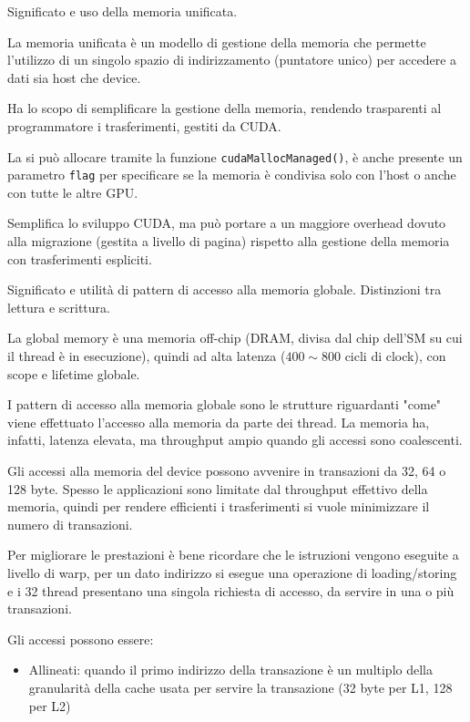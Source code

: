 \begin{questions}
    \question Significato e uso della memoria unificata.
    
    \begin{solution}
        La memoria unificata è un modello di gestione della memoria che permette l'utilizzo di un singolo spazio di indirizzamento (puntatore unico) per accedere a dati sia host che device. 
        
        Ha lo scopo di semplificare la gestione della memoria, rendendo trasparenti al programmatore i trasferimenti, gestiti da CUDA. 
        
        La si può allocare tramite la funzione \texttt{cudaMallocManaged()}, è anche presente un parametro \texttt{flag} per specificare se la memoria è condivisa solo con l'host o anche con tutte le altre GPU.
        
        Semplifica lo sviluppo CUDA, ma può portare a un maggiore overhead dovuto alla migrazione (gestita a livello di pagina) rispetto alla gestione della memoria con trasferimenti espliciti.
    \end{solution}
    
    \question Significato e utilità di pattern di accesso alla memoria globale. Distinzioni tra lettura e scrittura.
    
    \begin{solution}
        La global memory è una memoria off-chip (DRAM, divisa dal chip dell'SM su cui il thread è in esecuzione), quindi ad alta latenza ($400\sim 800$ cicli di clock), con scope e lifetime globale. 
        
        I pattern di accesso alla memoria globale sono le strutture riguardanti "come" viene effettuato l'accesso alla memoria da parte dei thread. La memoria ha, infatti, latenza elevata, ma throughput ampio quando gli accessi sono coalescenti.
        
        Gli accessi alla memoria del device possono avvenire in transazioni da 32, 64 o 128 byte. Spesso le applicazioni sono limitate dal throughput effettivo della memoria, quindi per rendere efficienti i trasferimenti si vuole minimizzare il numero di transazioni. 
        
        Per migliorare le prestazioni è bene ricordare che le istruzioni vengono eseguite a livello di warp, per un dato indirizzo si esegue una operazione di loading/storing e i 32 thread presentano una singola richiesta di accesso, da servire in una o più transazioni.
        
        Gli accessi possono essere:
        \begin{itemize}
            \item Allineati: quando il primo indirizzo della transazione è un multiplo della granularità della cache usata per servire la transazione (32 byte per L1, 128 per L2)
            

\end{itemize}
\end{solution}
\end{questions}
